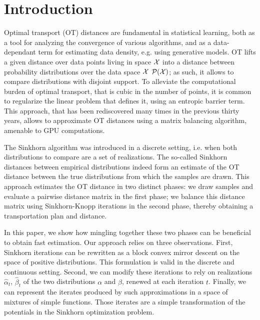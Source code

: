 \section{Introduction}

Optimal transport (OT) distances are fundamental in statistical learning, both
as a tool for analyzing the convergence of various algorithms, and as a
data-dependant term for estimating data density, e.g. using generative models.
OT lifts a given distance over data points living in space $\mathcal{X}$ into a distance
between probability distributions over the data space $\mathcal{X}$ $\mathcal{P}(\mathcal{X})$; as such,
it allows to compare distributions with disjoint support. To alleviate the
computational burden of optimal transport, that is cubic in the number of
points, it is common to regularize the linear problem that defines it, using an
entropic barrier term. This approach, that has been rediscovered many times in
the previous thirty years, allows to approximate OT distances using a matrix
balancing algorithm, amenable to GPU computations.

The Sinkhorn algorithm was introduced in a discrete setting, i.e. when both
distributions to compare are a set of realizations. The so-called Sinkhorn
distances between empirical distributions indeed form an estimate of the OT
distance between the true distributions from which the samples are drawn. This
approach estimates the OT distance in two distinct phases: we draw samples and
evaluate a pairwise distance matrix in the first phase; we balance this distance
matrix using Sinkhorn-Knopp iterations in the second phase, thereby obtaining a
transportation plan and distance.

In this paper, we show how mingling together these two phases can be beneficial
to obtain fast estimation.  Our approach relies on three observations. First,
Sinkhorn iterations can be rewritten as a block convex mirror descent on the
space of positive distributions. This formulation is valid in the discrete and
continuous setting. Second, we can modify these iterations to rely on
realizations $\hat \alpha_t$, $\hat \beta_t$ of the two distributions $\alpha$
and $\beta$, renewed at each iteration $t$. Finally, we can represent the
iterates produced by such approximations in a space of mixtures of simple
functions. Those iterates are a simple transformation of the potentials in the
Sinkhorn optimization problem.

